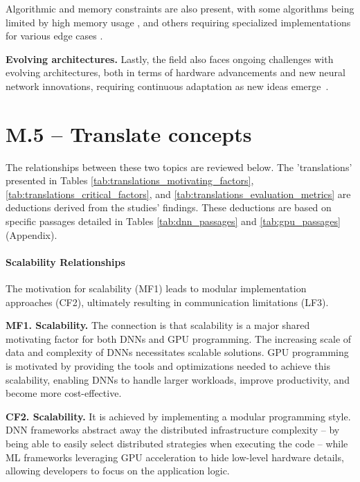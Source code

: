 Algorithmic and memory constraints are also present, with some algorithms being limited by high
memory usage , and others requiring specialized implementations for various edge
cases .

\textbf{Evolving architectures.}
Lastly, the field also faces ongoing challenges with evolving architectures, both in terms of hardware advancements
and new neural network innovations, requiring continuous adaptation as new ideas emerge~.

\section{M.5 -- Translate concepts}
\label{sec:translate-concepts}

The relationships between these two topics are reviewed below. The 'translations' presented in
Tables \ref{tab:translations_motivating_factors}, \ref{tab:translations_critical_factors}, and
\ref{tab:translations_evaluation_metrics} are deductions derived from the studies' findings. These
deductions are based on specific passages detailed in Tables \ref{tab:dnn_passages} and
\ref{tab:gpu_passages} (Appendix).




\paragraph{Scalability Relationships}
The motivation for scalability (MF1) leads to modular implementation approaches (CF2), ultimately
resulting in communication limitations (LF3).

\textbf{MF1. Scalability.} The connection is that scalability is a major shared motivating factor for both DNNs and GPU programming.
The increasing scale of data and complexity of DNNs necessitates scalable solutions. GPU programming is
motivated by providing the tools and optimizations needed to achieve this scalability, enabling DNNs to
handle larger workloads, improve productivity, and become more cost-effective.

\textbf{CF2. Scalability.} It is achieved by implementing a modular programming style. DNN frameworks
abstract away the distributed infrastructure complexity -- by being able to easily select distributed
strategies when executing the code -- while ML frameworks leveraging GPU acceleration to hide
low-level hardware details, allowing developers to focus on the application logic.

